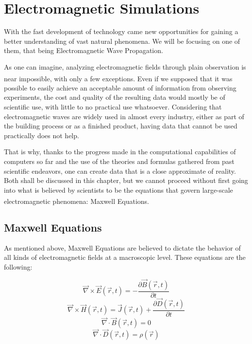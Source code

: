 
\section{Electromagnetic Simulations}
With the fast development of technology came new opportunities for gaining a better understanding of vast natural phenomena. We will be focusing on one of them, that being Electromagnetic Wave Propagation. 

As one can imagine, analyzing electromagnetic fields through plain observation is near impossible, with only a few exceptions\textsuperscript{\cite{cao2005first}}. Even if we supposed that it was possible to easily achieve an acceptable amount of information from observing experiments, the cost and quality of the resulting data would mostly be of scientific use, with little to no practical use whatsoever. Considering that electromagnetic waves are widely used in almost every industry, either as part of the building process or as a finished product, having data that cannot be used practically does not help. 

That is why, thanks to the progress made in the computational capabilities of computers so far and the use of the theories and formulas gathered from past scientific endeavors, one can create data that is a close approximate of reality. Both shall be discussed in this chapter, but we cannot proceed without first going into what is believed by scientists to be the equations that govern large-scale electromagnetic phenomena\textsuperscript{\cite{stratton2007electromagnetic}}: Maxwell Equations.

\subsection{Maxwell Equations}

As mentioned above, Maxwell Equations are believed to dictate the behavior of all kinds of electromagnetic fields at a macroscopic level. These equations are the following:

\begin{equation}
	\label{eqn:electricinduction}
	\vec{\nabla} \times \vec{E}(\vec{r},t) = - \frac{\partial \vec{B}(\vec{r},t)}{\partial t}
\end{equation}
\begin{equation}
	\label{eqn:amperesLaw}
	\vec{\nabla} \times \vec{H}(\vec{r},t) = \vec{J}(\vec{r},t) + \frac{\partial \vec{D}(\vec{r},t)}{\partial t}
\end{equation}
\begin{equation}
	\label{eqn:magneticDivergence}
	\vec{\nabla} \cdot \vec{B}(\vec{r},t) = 0
\end{equation}
\begin{equation}
	\label{eqn:gausslaw}
	\vec{\nabla} \cdot \vec{D}(\vec{r},t) = \rho (\vec{r})
\end{equation}

